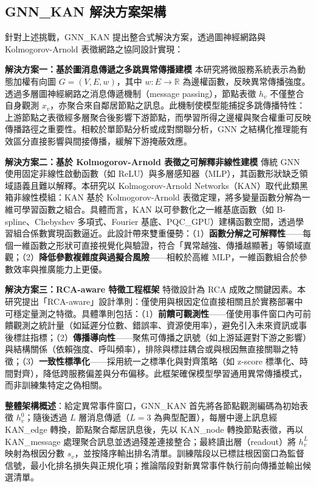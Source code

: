\documentclass[10pt,a4paper,twocolumn]{article}
\begin{document}
\subsection{GNN\_KAN 解決方案架構}

針對上述挑戰，GNN\_KAN 提出整合式解決方案，透過圖神經網路與 Kolmogorov-Arnold 表徵網路之協同設計實現：

\textbf{解決方案一：基於圖消息傳遞之多跳異常傳播建模}  
本研究將微服務系統表示為動態加權有向圖 $G = (V, E, w)$，其中 $w: E \to \mathbb{R}$ 為邊權函數，反映異常傳播強度。透過多層圖神經網路之消息傳遞機制（message passing），節點表徵 $h_v$ 不僅整合自身觀測 $x_v$，亦聚合來自鄰居節點之訊息。此機制使模型能捕捉多跳傳播特性：上游節點之表徵經多層聚合後影響下游節點，而學習所得之邊權與聚合權重可反映傳播路徑之重要性。相較於單節點分析或成對關聯分析，GNN 之結構化推理能有效區分直接影響與間接傳播，緩解下游掩蔽效應。

\textbf{解決方案二：基於 Kolmogorov-Arnold 表徵之可解釋非線性建模}  
傳統 GNN 使用固定非線性啟動函數（如 ReLU）與多層感知器（MLP），其函數形狀缺乏領域語義且難以解釋。本研究以 Kolmogorov-Arnold Networks（KAN）取代此類黑箱非線性模組：KAN 基於 Kolmogorov-Arnold 表徵定理，將多變量函數分解為一維可學習函數之組合。具體而言，KAN 以可參數化之一維基底函數（如 B-spline、Chebyshev 多項式、Fourier 基底、PQC\_GPU）建構函數空間，透過學習組合係數實現函數逼近。此設計帶來雙重優勢：（1）\textbf{函數分解之可解釋性}——每個一維函數之形狀可直接視覺化與驗證，符合「異常越強、傳播越顯著」等領域直觀；（2）\textbf{降低參數複雜度與過擬合風險}——相較於高維 MLP，一維函數組合於參數效率與推廣能力上更優。

\textbf{解決方案三：RCA-aware 特徵工程框架}  
特徵設計為 RCA 成敗之關鍵因素。本研究提出「RCA-aware」設計準則：僅使用與根因定位直接相關且於實務部署中可穩定量測之特徵。具體準則包括：（1）\textbf{前饋可觀測性}——僅使用事件窗口內可前饋觀測之統計量（如延遲分位數、錯誤率、資源使用率），避免引入未來資訊或事後標註指標；（2）\textbf{傳播導向性}——聚焦可傳播之訊號（如上游延遲對下游之影響）與結構關係（依賴強度、呼叫頻率），排除與標註耦合或與根因無直接關聯之特徵；（3）\textbf{一致性標準化}——採用統一之標準化與對齊策略（如 z-score 標準化、時間對齊），降低跨服務偏差與分布偏移。此框架確保模型學習通用異常傳播模式，而非訓練集特定之偽相關。

\textbf{整體架構概述}：給定異常事件窗口，GNN\_KAN 首先將各節點觀測編碼為初始表徵 $h_v^0$；隨後透過 $L$ 層消息傳遞（$L=3$ 為典型配置），每層中邊上訊息經 KAN\_edge 轉換，節點聚合鄰居訊息後，先以 KAN\_node 轉換節點表徵，再以 KAN\_message 處理聚合訊息並透過殘差連接整合；最終讀出層（readout）將 $h_v^L$ 映射為根因分數 $s_v$，並按降序輸出排名清單。訓練階段以已標註根因窗口為監督信號，最小化排名損失與正規化項；推論階段對新異常事件執行前向傳播並輸出候選清單。
\end{document}
